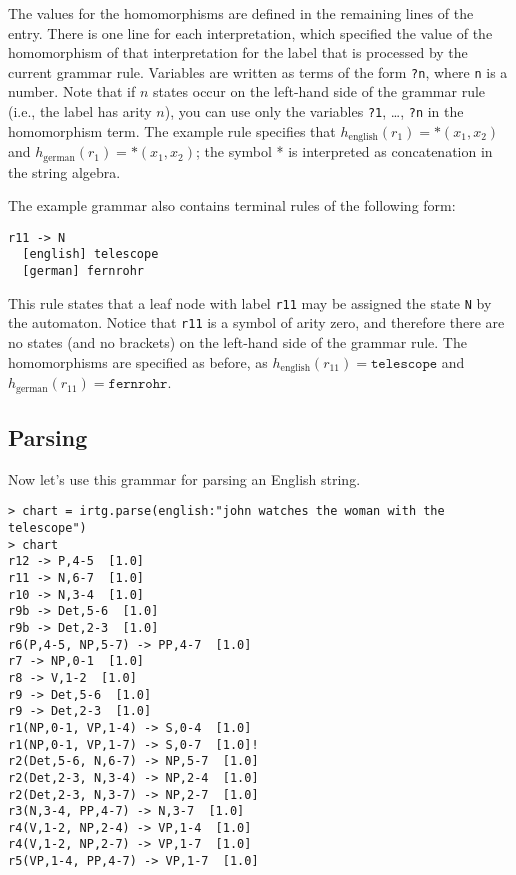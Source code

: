 \documentclass[11pt]{article}
\begin{document}
The values for the homomorphisms are defined in the remaining lines of
the entry. There is one line for each interpretation, which specified
the value of the homomorphism of that interpretation for the label
that is processed by the current grammar rule.  Variables are written
as terms of the form \texttt{?n}, where \verb?n? is a number. Note
that if $n$ states occur on the left-hand side of the grammar rule
(i.e., the label has arity $n$), you can use only the variables
\texttt{?1}, \ldots, \texttt{?n} in the homomorphism term. The example
rule specifies that $h_\mathrm{english}(r_1) = *(x_1,x_2)$ and
$h_\mathrm{german}(r_1) = *(x_1,x_2)$; the symbol * is interpreted as
concatenation in the string algebra.

The example grammar also contains terminal rules of the following
form:

\begin{verbatim}
r11 -> N
  [english] telescope
  [german] fernrohr
\end{verbatim}

This rule states that a leaf node with label \verb?r11? may be
assigned the state \verb?N? by the automaton. Notice that \verb?r11?
is a symbol of arity zero, and therefore there are no states (and no
brackets) on the left-hand side of the grammar rule. The homomorphisms
are specified as before, as $h_\mathrm{english}(r_{11}) =
\mathtt{telescope}$ and $h_\mathrm{german}(r_{11}) =
\mathtt{fernrohr}$.


\subsection{Parsing}

Now let's use this grammar for parsing an English string.

\begin{verbatim}
> chart = irtg.parse(english:"john watches the woman with the telescope")
> chart
r12 -> P,4-5  [1.0]
r11 -> N,6-7  [1.0]
r10 -> N,3-4  [1.0]
r9b -> Det,5-6  [1.0]
r9b -> Det,2-3  [1.0]
r6(P,4-5, NP,5-7) -> PP,4-7  [1.0]
r7 -> NP,0-1  [1.0]
r8 -> V,1-2  [1.0]
r9 -> Det,5-6  [1.0]
r9 -> Det,2-3  [1.0]
r1(NP,0-1, VP,1-4) -> S,0-4  [1.0]
r1(NP,0-1, VP,1-7) -> S,0-7  [1.0]!
r2(Det,5-6, N,6-7) -> NP,5-7  [1.0]
r2(Det,2-3, N,3-4) -> NP,2-4  [1.0]
r2(Det,2-3, N,3-7) -> NP,2-7  [1.0]
r3(N,3-4, PP,4-7) -> N,3-7  [1.0]
r4(V,1-2, NP,2-4) -> VP,1-4  [1.0]
r4(V,1-2, NP,2-7) -> VP,1-7  [1.0]
r5(VP,1-4, PP,4-7) -> VP,1-7  [1.0]
\end{verbatim}
\end{document}
